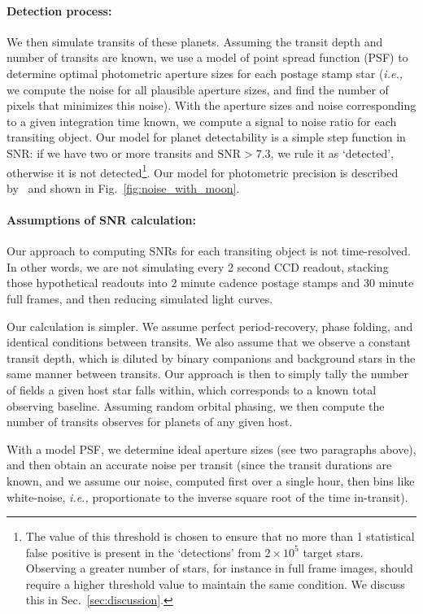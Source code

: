 \paragraph{Detection process:}
We then simulate transits of these planets.  Assuming the transit
depth and number of transits are known, we use a model of \tesss point
spread function (PSF) to determine optimal photometric aperture sizes
for each postage stamp star (\textit{i.e.,} we compute the noise for
all plausible aperture sizes, and find the number of pixels that
minimizes this noise).  With the aperture sizes and noise
corresponding to a given integration time known, we compute a signal
to noise ratio for each transiting object.  Our model for planet
detectability is a simple step function in SNR: if we have two or more
transits and $\text{SNR} > 7.3$, we rule it as `detected', otherwise
it is not detected\footnote{The value of this threshold is chosen to
  ensure that no more than 1 statistical false positive is present in
  the `detections' from $2\times10^5$ target stars. Observing a
  greater number of stars, for instance in full frame images, should
  require a higher threshold value to maintain the same condition. We
  discuss this in Sec.~\protect\ref{sec:discussion}.}.  Our model for
\tesss photometric precision is described
by~ and shown in
Fig.~\ref{fig:noise_with_moon}.

\paragraph{Assumptions of SNR calculation:}
Our approach to computing SNRs for each transiting object is not
time-resolved.  In other words, we are not simulating every 2 second
CCD readout, stacking those hypothetical readouts into 2 minute
cadence postage stamps and 30 minute full frames, and then reducing
simulated light curves.

Our calculation is simpler.  We assume perfect period-recovery, phase
folding, and identical conditions between transits.  We also assume
that we observe a constant transit depth, which is diluted by binary
companions and background stars in the same manner between transits.
Our approach is then to simply tally the number of \tess fields a
given host star falls within, which corresponds to a known total
observing baseline.  Assuming random orbital phasing, we then compute
the number of transits \tess observes for planets of any given host.

With a model PSF, we determine ideal aperture sizes (see two
paragraphs above), and then obtain an accurate noise per transit
(since the transit durations are known, and we assume our noise,
computed first over a single hour, then bins like white-noise,
\textit{i.e.,} proportionate to the inverse square root of the time
in-transit).


